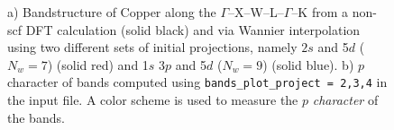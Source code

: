 \begin{figure}[h!]
\centering
{}
\caption{a) Bandstructure of Copper along the $\Gamma$--X--W--L--$\Gamma$--K from a non-scf DFT calculation (solid black) and via Wannier interpolation using two different sets of initial projections, namely $2s$ and 5$d$ ($N_w =7$) (solid red) and 1$s$ 3$p$ and 5$d$ ($N_w=9$) (solid blue). b) $p$ character of bands computed using {\tt bands\_plot\_project = 2,3,4} in the input file. A color scheme is used to measure the $p$ {\it character} of the bands.}\label{fig6.2}
\end{figure}

